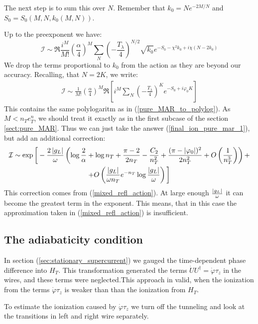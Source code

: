 The next step is to sum this over $N$. Remember that $k_{0}=Ne^{-2M/N}$
and $S_{0}=S_{0}(M,N,k_{0}(M,N))$. 

Up to the preexponent we have:
\[
\mathcal{I}
\sim
\Re\frac{i^{M}}{M!}\left(\frac{\alpha}{4}\right)^{M}\sum_{N}\left(-\frac{T_{\lambda}}{4}\right)^{N/2}\sqrt{k_{0}}e^{-S_{0}-\chi^{2}k_{0}+i\chi(N-2k_{0})}
\]
We drop the terms proportional to $ k_0 $ from the action as they are beyond our accuracy. Recalling, that $ N=2K $, we write:
\begin{gather}
	\mathcal{I}
	\sim
	\frac{1}{M!}
	\left(\frac{\alpha}{4}\right)^{M}\Re
	\left[ i^{M}
	\sum_{N}
	\left(-\frac{T_{\lambda}}{4}\right)^{K}
	e^{-S_{0}+i\varphi_{0}K}
	\right]
\end{gather}
This contains the same polylogaritm as in (\ref{pure_MAR_to_polylog}). As $ M<n_Te^n_T $, we should treat it exactly as in the first subcase of the section \ref{sect:pure_MAR}. Thus we can just take the answer (\ref{final_ion_pure_mar_1}), but add an additional correction:
\begin{multline}
		\mathcal{I}
	\sim
	\exp
	\bigg[
		-
		\frac
		{2\left|g_L\right|}
		{\omega}
		\left(
			\log
			\frac{2}{\alpha}
			+
			\log n_T
			+
			\frac{\pi-2}{2n_T}
			-
			\frac{C_2}{n_T^2}
			+
			\frac{(\pi-|\varphi_{0}|)^{2}}{2n_T^{2}}
			+
			O\left(\frac{1}{n_T^3}\right)
		\right)
	+
	\\
	+
	O
	\left( 		\frac{\left|g_L\right|}{\omega n_T}
			e^{-n_T}
			\log\frac{\left|g_L\right|}{\omega}
	\right)		
	\bigg]
\end{multline}
This correction comes from (\ref{mixed_refl_action}). At large enough $ \frac{\left|g_L\right|}{\omega} $ it can become the greatest term in the exponent. This means, that in this case the approximation taken in (\ref{mixed_refl_action}) is insufficient.  

\subsection{The adiabaticity condition}
In section (\ref{sec:stationary_supercurrent}) we gauged the time-dependent phase difference into $ H_T $. This transformation generated the terms $ \dot{U}U^\dagger=\dot{\varphi}\tau_z $ in the wires, and these terms were neglected.This approach in valid, when the ionization from the terms $  \dot{\varphi}\tau_z $ is weaker than than the ionization from $ H_T$.

To estimate the ionization caused by $ \dot{\varphi}\tau_z $ we turn off the tunneling  and look at the transitions in left and right wire separately.

